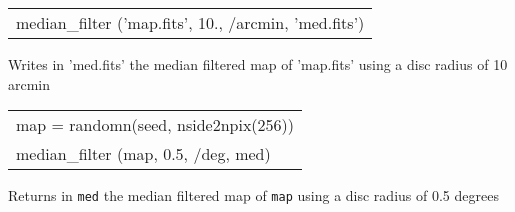 \begin{example}
{
\begin{tabular}{l} %
median\_filter  ('map.fits', 10., /arcmin, 'med.fits') \\
\end{tabular}
}
{Writes in 'med.fits' the median filtered map of 'map.fits' using a disc radius
  of 10 arcmin}
\end{example}


\begin{example}
{
\begin{tabular}{l} %
map =  randomn(seed, nside2npix(256)) \\
median\_filter  (map, 0.5, /deg, med) \\
\end{tabular}
}
{Returns in {\tt med} the median filtered map of {\tt map} using a disc radius
  of 0.5 degrees}
\end{example}


